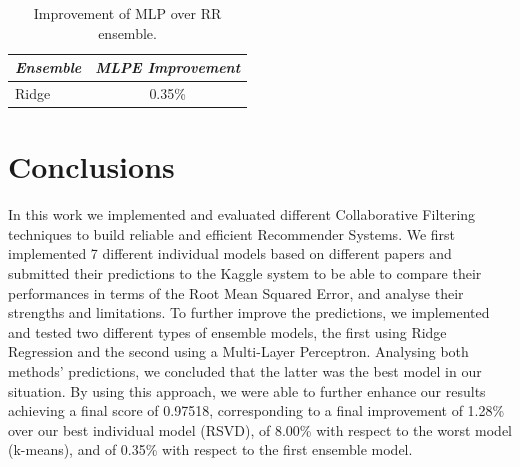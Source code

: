 \documentclass[10pt,conference,compsocconf]{IEEEtran}
\begin{document}
\begin{table}[h!]
	\centering
	\begin{tabular}{l|c}
		\textit{\textbf{Ensemble}} & \textit{\textbf{MLPE Improvement}} \\
		\hline
		Ridge                     &      0.35\%                 \\                              
	\end{tabular}
\caption{Improvement of MLP over RR ensemble.}
\label{enssum}
\end{table}

\section{Conclusions}
\label{conc}

In this work we implemented and evaluated different Collaborative Filtering techniques to build reliable and efficient Recommender Systems. We first implemented 7 different individual models based on different papers and submitted their predictions to the Kaggle system to be able to compare their performances in terms of the Root Mean Squared Error, and analyse their strengths and limitations. To further improve the predictions, we implemented and tested two different types of ensemble models, the first using Ridge Regression and the second using a Multi-Layer Perceptron. Analysing both methods' predictions, we concluded that the latter was the best model in our situation. By using this approach, we were able to further enhance our results achieving a final score of 0.97518, corresponding to a final improvement of 1.28\% over our best individual model (RSVD), of 8.00\% with respect to the worst model (k-means), and of 0.35\% with respect to the first ensemble model.




\end{document}
